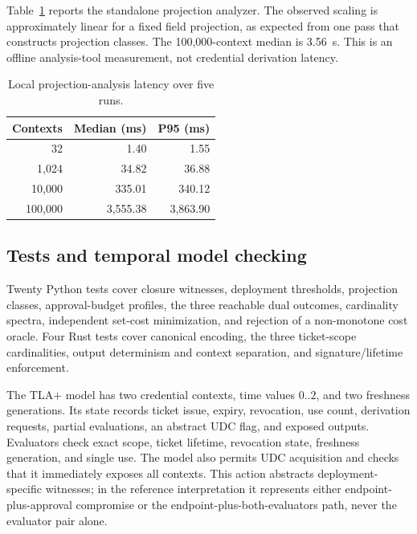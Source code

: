 \documentclass[preprint,12pt]{elsarticle}
\begin{document}
Table~\ref{tab:performance} reports the standalone projection analyzer.  The
observed scaling is approximately linear for a fixed field projection, as
expected from one pass that constructs projection classes.  The 100,000-context
median is 3.56~s.  This is an offline analysis-tool measurement, not credential
derivation latency.

\begin{table}[t]
\centering
\caption{Local projection-analysis latency over five runs.}
\label{tab:performance}
\small
\begin{tabular}{rrr}
\toprule
Contexts & Median (ms) & P95 (ms) \\
\midrule
32 & 1.40 & 1.55 \\
1,024 & 34.82 & 36.88 \\
10,000 & 335.01 & 340.12 \\
100,000 & 3,555.38 & 3,863.90 \\
\bottomrule
\end{tabular}
\end{table}

\subsection{Tests and temporal model checking}
\label{sec:tla-evaluation}

Twenty Python tests cover closure witnesses, deployment thresholds, projection
classes, approval-budget profiles, the three reachable dual outcomes,
cardinality spectra, independent set-cost minimization, and rejection of a
non-monotone cost oracle.  Four Rust tests cover canonical encoding, the three
ticket-scope cardinalities, output determinism and context separation, and
signature/lifetime enforcement.

The TLA+ model \cite{lamport2002tla} has two credential contexts, time values
$0..2$, and two freshness generations.  Its state records ticket issue,
expiry, revocation, use count, derivation requests, partial evaluations, an
abstract UDC flag, and exposed outputs.
Evaluators check exact scope, ticket
lifetime, revocation state, freshness generation, and single use.  The model
also permits UDC acquisition and checks that it immediately exposes all
contexts.  This action abstracts deployment-specific witnesses; in the
reference interpretation it represents either endpoint-plus-approval
compromise or the endpoint-plus-both-evaluators path, never the evaluator pair
alone.
\end{document}

